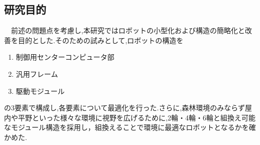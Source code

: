 \subsection{研究目的}
\ \ 前述の問題点を考慮し,本研究ではロボットの小型化および構造の簡略化と改善を目的とした.そのための試みとして,ロボットの構造を
\begin{enumerate}
	\item 制御用センターコンピュータ部
	\item 汎用フレーム
	\item 駆動モジュール
\end{enumerate}
の3要素で構成し,各要素について最適化を行った.さらに,森林環境のみならず屋内や平野といった様々な環境に視野を広げるために,2輪・4輪・6輪と組換え可能なモジュール構造を採用し，組換えることで環境に最適なロボットとなるかを確かめた.